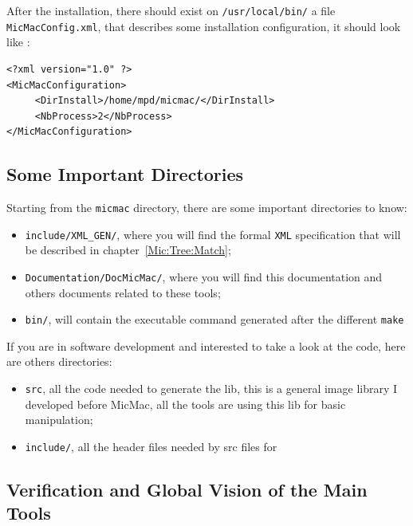 After the installation, there should exist on {\tt /usr/local/bin/} a file
{\tt MicMacConfig.xml}, that describes some installation configuration,
it should look like :

\label{Mic:File:Config}

\begin{verbatim}
<?xml version="1.0" ?>
<MicMacConfiguration>
     <DirInstall>/home/mpd/micmac/</DirInstall>
     <NbProcess>2</NbProcess>
</MicMacConfiguration>
\end{verbatim}



\subsection{Some Important Directories}

Starting from the {\tt micmac} directory, there are some important directories
to know:

\begin{itemize}
   \item {\tt include/XML\_GEN/}, where you will find the formal {\tt XML} specification that will
         be described in chapter~\ref{Mic:Tree:Match};

   \item {\tt Documentation/DocMicMac/}, where you will find this documentation and others
        documents related to these tools;

   \item {\tt bin/}, will contain the executable command generated  after the different {\tt make}
\end{itemize}


If you are in software development and interested to take a look at the code,
here are others directories:


\begin{itemize}
   \item {\tt src}, all the \CPP code needed to generate the \ELISE lib, this is a general image library
         I developed before MicMac, all the tools are using this lib for basic manipulation;

   \item {\tt include/}, all the header files needed by src files for \ELISE
\end{itemize}



\subsection{Verification and Global Vision of the Main Tools}

